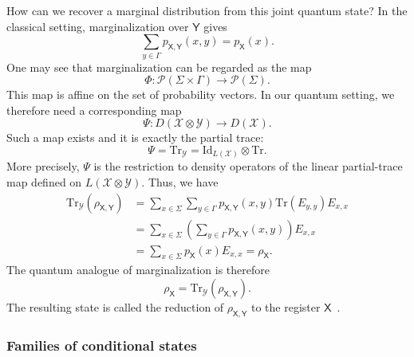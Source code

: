 \documentclass[
    aps,
    pra,
    reprint,
    superscriptaddress,
    nofootinbib
]{revtex4-2}
\theoremstyle{definition}
\theoremstyle{plain}
\begin{document}
How can we recover a marginal distribution from this joint quantum state?
In the classical setting, marginalization over $\mathsf{Y}$ gives
\begin{equation}
    \sum_{y\in\Gamma}
    p_{\mathsf{X},\mathsf{Y}}(x,y)
    =
    p_{\mathsf{X}}(x).
\end{equation}
One may see that marginalization can be regarded as the map
\begin{equation}
    \Phi:
    \mathcal{P}(\Sigma\times\Gamma)
    \to
    \mathcal{P}(\Sigma).
\end{equation}
This map is affine on the set of probability vectors. In our quantum
setting, we therefore need a corresponding map
\begin{equation}
    \Psi:
    D(\mathcal{X}\otimes\mathcal{Y})
    \to
    D(\mathcal{X}).
\end{equation}
Such a map exists and it is exactly the partial trace:
\begin{equation}
    \Psi
    =
    \mathrm{Tr}_{\mathcal{Y}}
    =
    \mathrm{Id}_{L(\mathcal{X})}\otimes\mathrm{Tr}.
\end{equation}
More precisely, $\Psi$ is the restriction to density operators of the
linear partial-trace map defined on
$L(\mathcal{X}\otimes\mathcal{Y})$. Thus, we have
\begin{align}
    \mathrm{Tr}_{\mathcal{Y}}
    (\rho_{\mathsf{X},\mathsf{Y}})
    &=
    \sum_{x\in\Sigma}\sum_{y\in\Gamma}
    p_{\mathsf{X},\mathsf{Y}}(x,y)
    \mathrm{Tr}(E_{y,y})E_{x,x}\\
    &=
    \sum_{x\in\Sigma}
    \left(
        \sum_{y\in\Gamma}
        p_{\mathsf{X},\mathsf{Y}}(x,y)
    \right)E_{x,x}\\
    &=
    \sum_{x\in\Sigma}p_{\mathsf{X}}(x)E_{x,x}
    =
    \rho_{\mathsf{X}}.
\end{align}
The quantum analogue of marginalization is therefore
\begin{equation}
    \rho_{\mathsf{X}}
    =
    \mathrm{Tr}_{\mathcal{Y}}
    (\rho_{\mathsf{X},\mathsf{Y}}).
\end{equation}
The resulting state is called the reduction of
$\rho_{\mathsf{X},\mathsf{Y}}$ to the register
$\mathsf{X}$~\cite[Sec.~2.1.3]{Watrous2018}.

\subsubsection{Families of conditional states}
\label{subsubsec:cpsasqs}
\end{document}

